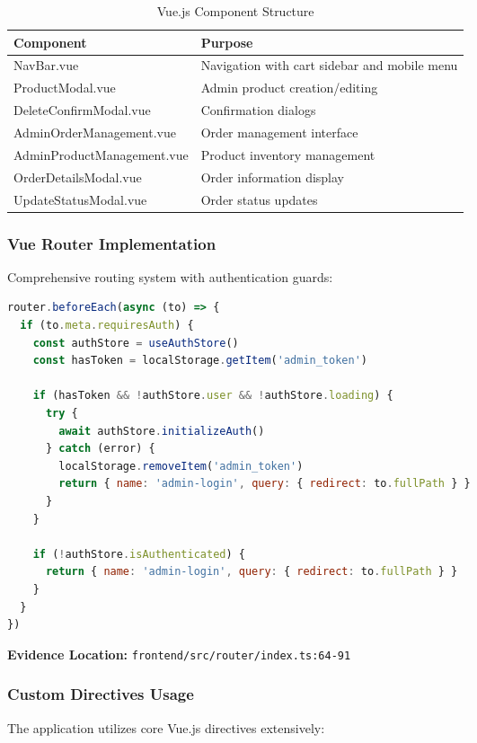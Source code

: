 \documentclass[12pt,a4paper]{article}
\begin{document}
\begin{table}[H]
\centering
\begin{tabularx}{\textwidth}{|l|X|}
\hline
\textbf{Component} & \textbf{Purpose} \\
\hline
NavBar.vue & Navigation with cart sidebar and mobile menu \\
ProductModal.vue & Admin product creation/editing \\
DeleteConfirmModal.vue & Confirmation dialogs \\
AdminOrderManagement.vue & Order management interface \\
AdminProductManagement.vue & Product inventory management \\
OrderDetailsModal.vue & Order information display \\
UpdateStatusModal.vue & Order status updates \\
\hline
\end{tabularx}
\caption{Vue.js Component Structure}
\end{table}

\subsubsection{Vue Router Implementation}
Comprehensive routing system with authentication guards:

\begin{lstlisting}[language=javascript, caption=Router Configuration with Auth Guards]
router.beforeEach(async (to) => {
  if (to.meta.requiresAuth) {
    const authStore = useAuthStore()
    const hasToken = localStorage.getItem('admin_token')
    
    if (hasToken && !authStore.user && !authStore.loading) {
      try {
        await authStore.initializeAuth()
      } catch (error) {
        localStorage.removeItem('admin_token')
        return { name: 'admin-login', query: { redirect: to.fullPath } }
      }
    }
    
    if (!authStore.isAuthenticated) {
      return { name: 'admin-login', query: { redirect: to.fullPath } }
    }
  }
})
\end{lstlisting}

\textbf{Evidence Location:} \texttt{frontend/src/router/index.ts:64-91}

\subsubsection{Custom Directives Usage}
The application utilizes core Vue.js directives extensively:
\end{document}
